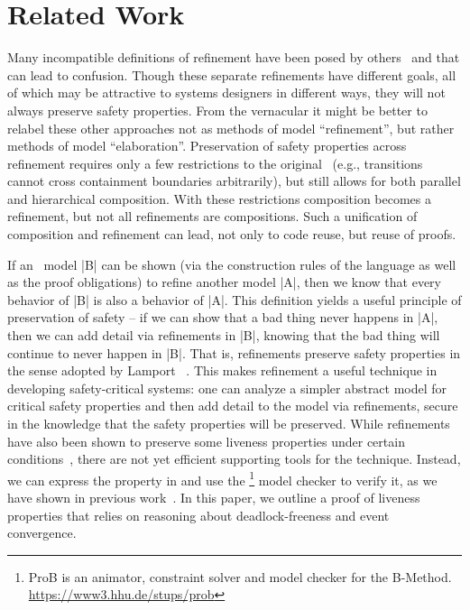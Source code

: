 
\section{Related Work}
\label{sec:relatedWork}

Many incompatible definitions of refinement have been posed by
others~\cite{Syriani_2019,Maraninchi91theargos} and that can lead to confusion.
Though these separate refinements have different goals, all of which may be
attractive to systems designers in different ways,
they will not always preserve safety properties.  
From the \EventB vernacular it might be better to relabel these other approaches
not as methods of model ``refinement'', but rather methods of model
``elaboration''.  
Preservation of safety properties across refinement requires only a few
restrictions to the original~\cite{Harel} \SCs (e.g., transitions cannot cross
containment boundaries arbitrarily), but still allows for both parallel and
hierarchical composition. 
With these restrictions composition becomes a refinement, but not all
refinements are compositions.  
Such a unification of composition and refinement can lead, not only to code
reuse, but reuse of proofs.

If an \EventB\ model |B| can be shown (via the construction rules of the \EventB
language as well as the proof obligations) to refine another \EventB
model |A|, then we know that every behavior of |B| is also a behavior
of |A|. This definition yields a useful principle of preservation of
safety -- if we can show that a bad thing never happens in |A|, then
we can add detail via refinements in |B|, knowing that the bad thing
will continue to never happen in |B|. That is, \EventB refinements
preserve safety properties in the sense adopted by Lamport
~\cite{lamport1977proving}. This makes refinement a useful technique
in developing safety-critical systems: one can analyze a simpler
abstract model for critical safety properties and then add detail to
the model via refinements, secure in the knowledge that the safety
properties will be preserved. While \EventB refinements have also been
shown to preserve some liveness properties under certain
conditions~\cite{hoang2016ltl}, there are not yet efficient supporting
tools for the technique. Instead, we can express the property in \LTL
and use the \PROB\footnote{ProB is an animator, constraint solver and
  model checker for the B-Method. \url{https://www3.hhu.de/stups/prob}}
model checker to verify it, as we have shown in previous
work~\cite{detect2020}.  In this paper, we outline a proof of liveness
properties that relies on reasoning about deadlock-freeness and event
convergence.

